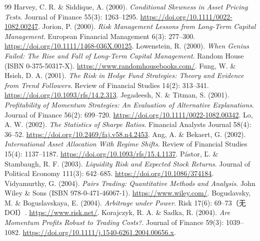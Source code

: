 \begin{thebibliography}{99}
 Harvey, C. R. \& Siddique, A. (2000). \emph{Conditional Skewness in Asset Pricing Tests}. Journal of Finance 55(3): 1263--1295. \href{https://doi.org/10.1111/0022-1082.00247}{https://doi.org/10.1111/0022-1082.00247}.
 Jorion, P. (2000). \emph{Risk Management Lessons from Long-Term Capital Management}. European Financial Management 6(3): 277--300. \href{https://doi.org/10.1111/1468-036X.00125}{https://doi.org/10.1111/1468-036X.00125}.
 Lowenstein, R. (2000). \emph{When Genius Failed: The Rise and Fall of Long-Term Capital Management}. Random House (ISBN 0-375-50317-X). \href{https://www.randomhousebooks.com/}{https://www.randomhousebooks.com/}.
 Fung, W. \& Hsieh, D. A. (2001). \emph{The Risk in Hedge Fund Strategies: Theory and Evidence from Trend Followers}. Review of Financial Studies 14(2): 313--341. \href{https://doi.org/10.1093/rfs/14.2.313}{https://doi.org/10.1093/rfs/14.2.313}.
 Jegadeesh, N. \& Titman, S. (2001). \emph{Profitability of Momentum Strategies: An Evaluation of Alternative Explanations}. Journal of Finance 56(2): 699--720. \href{https://doi.org/10.1111/0022-1082.00342}{https://doi.org/10.1111/0022-1082.00342}.
 Lo, A. W. (2002). \emph{The Statistics of Sharpe Ratios}. Financial Analysts Journal 58(4): 36--52. \href{https://doi.org/10.2469/faj.v58.n4.2453}{https://doi.org/10.2469/faj.v58.n4.2453}.
 Ang, A. \& Bekaert, G. (2002). \emph{International Asset Allocation With Regime Shifts}. Review of Financial Studies 15(4): 1137--1187. \href{https://doi.org/10.1093/rfs/15.4.1137}{https://doi.org/10.1093/rfs/15.4.1137}.
 Pástor, Ľ. \& Stambaugh, R. F. (2003). \emph{Liquidity Risk and Expected Stock Returns}. Journal of Political Economy 111(3): 642--685. \href{https://doi.org/10.1086/374184}{https://doi.org/10.1086/374184}.
 Vidyamurthy, G. (2004). \emph{Pairs Trading: Quantitative Methods and Analysis}. John Wiley \& Sons (ISBN 978-0-471-46067-1). \href{https://www.wiley.com/}{https://www.wiley.com/}.
 Boguslavsky, M. \& Boguslavskaya, E. (2004). \emph{Arbitrage under Power}. Risk 17(6): 69--73（无 DOI）. \href{https://www.risk.net/}{https://www.risk.net/}.
 Korajczyk, R. A. \& Sadka, R. (2004). \emph{Are Momentum Profits Robust to Trading Costs?}. Journal of Finance 59(3): 1039--1082. \href{https://doi.org/10.1111/j.1540-6261.2004.00656.x}{https://doi.org/10.1111/j.1540-6261.2004.00656.x}.

\end{thebibliography}
